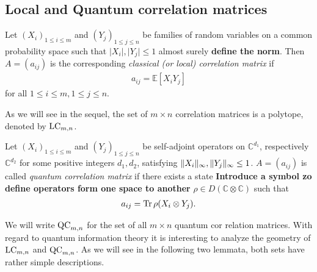 \subsection{Local and Quantum correlation matrices}
\begin{dfn}
	Let $ (X_i)_{1 \le i \le m } $ and $ (Y_j)_{1 \le j \le n} $ be families of random variables on a common probability space such that $ \vert X_i \vert, \vert Y_j \vert \le 1 $ almost surely \textbf{define the norm}. Then $ A=(a_{ij}) $ is the corresponding {\itshape classical (or local) correlation matrix} if 
	\begin{align*}
		a_{ij} = \mathbb{E}[X_iY_j]
	\end{align*}
	for all $ 1 \le i \le m, 1 \le j \le n $.
\end{dfn}
As we will see in the sequel, the set of $ m \times n $ correlation matrices is a polytope, denoted by $ \textup{LC}_{m,n} $.

\begin{dfn}
	Let $ (X_i)_{1 \le i \le m } $ and $ (Y_j)_{1 \le j \le n} $ be self-adjoint operators on $ \mathbb{C}^{d_1} $, respectively $ \mathbb{C}^{d_2} $ for some positive integers $ d_1,d_2 $, satisfying $  \Vert {X_i} \Vert_{\infty},  \Vert {Y_j} \Vert_{\infty} \le 1 $. $ A = (a_{ij}) $ is called {\itshape quantum correlation matrix} if there exists a state \textbf{Introduce a symbol zo define operators form one space to another} $ \rho \in D(\mathbb{C} \otimes \mathbb{C})$ such that 
	\begin{align}\label{QCaij}
		a_{ij} = \text{Tr} \, {\rho (X_i \otimes Y_j)} .
	\end{align}
\end{dfn}
We will write $ \textup{QC}_{m,n} $ for the set of all $ m \times n $ quantum cor relation matrices.
With regard to quantum information theory it is interesting to analyze the geometry of $ \textup{LC}_{m,n} $ and $ \textup{QC}_{m,n} $. As we will see in the following two lemmata, both sets have rather simple descriptions. 

